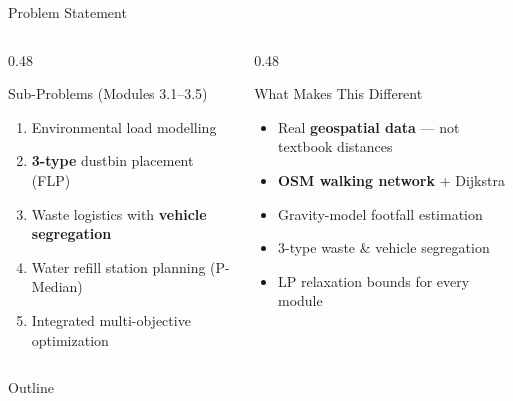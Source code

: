 \documentclass[aspectratio=169]{beamer}
\begin{document}
\begin{frame}{Problem Statement}
    \begin{columns}[T]
        \begin{column}{0.48\textwidth}
            \begin{block}{Sub-Problems (Modules 3.1--3.5)}
                \begin{enumerate}
                    \item[\textbf{3.1}] Environmental load modelling
                    \item[\textbf{3.2}] \textbf{3-type} dustbin placement (FLP)
                    \item[\textbf{3.3}] Waste logistics with \textbf{vehicle segregation}
                    \item[\textbf{3.4}] Water refill station planning (P-Median)
                    \item[\textbf{3.5}] Integrated multi-objective optimization
                \end{enumerate}
            \end{block}
        \end{column}
        \begin{column}{0.48\textwidth}
            \begin{exampleblock}{What Makes This Different}
                \begin{itemize}
                    \item Real \textbf{geospatial data} --- not textbook distances
                    \item \textbf{OSM walking network} + Dijkstra
                    \item Gravity-model footfall estimation
                    \item 3-type waste \& vehicle segregation
                    \item LP relaxation bounds for every module
                \end{itemize}
            \end{exampleblock}
        \end{column}
    \end{columns}
\end{frame}

\begin{frame}{Outline}
    \tableofcontents[hideallsubsections]
\end{frame}

\end{document}
